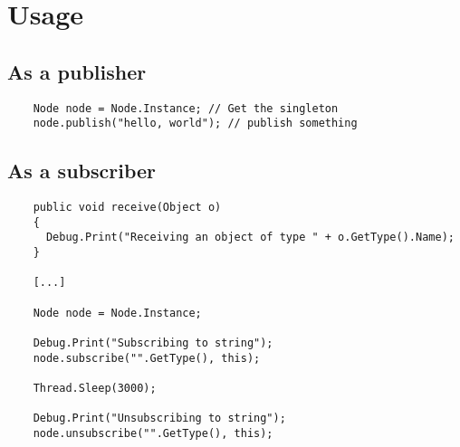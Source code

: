 \documentclass{beamer}
\begin{document}
\section{Usage}
\subsection{As a publisher}
\begin{frame}[fragile]
  \begin{verbatim}
    Node node = Node.Instance; // Get the singleton
    node.publish("hello, world"); // publish something
  \end{verbatim}
\end{frame}

\subsection{As a subscriber}
\begin{frame}[fragile]
  \begin{verbatim}
    public void receive(Object o)
    {
      Debug.Print("Receiving an object of type " + o.GetType().Name);
    }

    [...]

    Node node = Node.Instance;

    Debug.Print("Subscribing to string");
    node.subscribe("".GetType(), this);

    Thread.Sleep(3000);

    Debug.Print("Unsubscribing to string");
    node.unsubscribe("".GetType(), this);
  \end{verbatim}
\end{frame}
\end{document}
